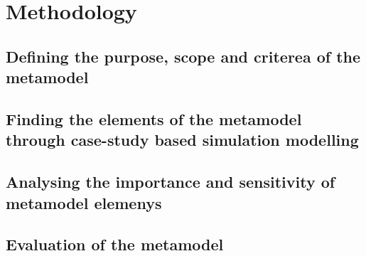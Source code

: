\section{Methodology}

\subsection{Defining the purpose, scope and criterea of the metamodel}

\subsection{Finding the elements of the metamodel through case-study based simulation modelling}

\subsection{Analysing the importance and sensitivity of metamodel elemenys}

\subsection{Evaluation of the metamodel}
